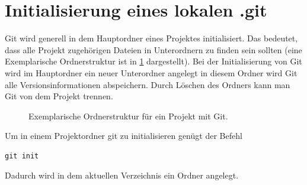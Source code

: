 \section{Initialisierung eines lokalen .git}
Git wird generell in dem Hauptordner eines Projektes initialisiert. Das bedeutet, dass alle Projekt zugehörigen Dateien in Unterordnern zu finden sein sollten (eine Exemplarische Ordnerstruktur ist in \ref{fig:dir_struc} dargestellt). Bei der Initialisierung von Git wird im Hauptordner ein neuer Unterordner   angelegt in diesem Ordner wird Git alle Versionsinformationen abspeichern. Durch Löschen des Ordners kann man Git von dem Projekt trennen.
\begin{figure}[!h]
    \caption{Exemplarische Ordnerstruktur für ein Projekt mit Git.}
    \label{fig:dir_struc}
\end{figure}

Um in einem Projektordner git zu initialisieren genügt der Befehl 
\begin{lstlisting}
git init
\end{lstlisting}
Dadurch wird in dem aktuellen Verzeichnis ein  Ordner angelegt.
